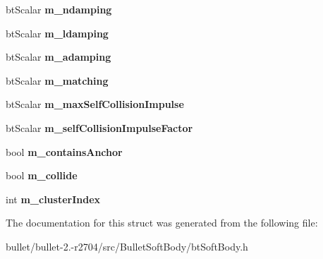 \begin{DoxyCompactItemize}
\item 
\hypertarget{structbt_soft_body_1_1_cluster_a6ea4166fcd7e69685daaee90786ba49a}{bt\+Scalar {\bfseries m\+\_\+ndamping}}\label{structbt_soft_body_1_1_cluster_a6ea4166fcd7e69685daaee90786ba49a}

\item 
\hypertarget{structbt_soft_body_1_1_cluster_a496233af537fdcb98c64f853b2d2ca2a}{bt\+Scalar {\bfseries m\+\_\+ldamping}}\label{structbt_soft_body_1_1_cluster_a496233af537fdcb98c64f853b2d2ca2a}

\item 
\hypertarget{structbt_soft_body_1_1_cluster_ac0c0e542d10b631bd457db435d5bb8ba}{bt\+Scalar {\bfseries m\+\_\+adamping}}\label{structbt_soft_body_1_1_cluster_ac0c0e542d10b631bd457db435d5bb8ba}

\item 
\hypertarget{structbt_soft_body_1_1_cluster_a660db0fd423e1f3abf72d5074ba23b64}{bt\+Scalar {\bfseries m\+\_\+matching}}\label{structbt_soft_body_1_1_cluster_a660db0fd423e1f3abf72d5074ba23b64}

\item 
\hypertarget{structbt_soft_body_1_1_cluster_a4863386788f38b4b1f59c42a69df7e15}{bt\+Scalar {\bfseries m\+\_\+max\+Self\+Collision\+Impulse}}\label{structbt_soft_body_1_1_cluster_a4863386788f38b4b1f59c42a69df7e15}

\item 
\hypertarget{structbt_soft_body_1_1_cluster_adc335614389856a98e06e5dc10e89c2b}{bt\+Scalar {\bfseries m\+\_\+self\+Collision\+Impulse\+Factor}}\label{structbt_soft_body_1_1_cluster_adc335614389856a98e06e5dc10e89c2b}

\item 
\hypertarget{structbt_soft_body_1_1_cluster_ac40f1e6c289a6c81cfbede28884cd53a}{bool {\bfseries m\+\_\+contains\+Anchor}}\label{structbt_soft_body_1_1_cluster_ac40f1e6c289a6c81cfbede28884cd53a}

\item 
\hypertarget{structbt_soft_body_1_1_cluster_ab64d0063b57ece06113a4d96dfcdbd2c}{bool {\bfseries m\+\_\+collide}}\label{structbt_soft_body_1_1_cluster_ab64d0063b57ece06113a4d96dfcdbd2c}

\item 
\hypertarget{structbt_soft_body_1_1_cluster_a9e0de77b4b37fd740da6bd2536505f64}{int {\bfseries m\+\_\+cluster\+Index}}\label{structbt_soft_body_1_1_cluster_a9e0de77b4b37fd740da6bd2536505f64}

\end{DoxyCompactItemize}


The documentation for this struct was generated from the following file\+:\begin{DoxyCompactItemize}
\item 
bullet/bullet-\/2.-\/r2704/src/\+Bullet\+Soft\+Body/bt\+Soft\+Body.\+h\end{DoxyCompactItemize}
